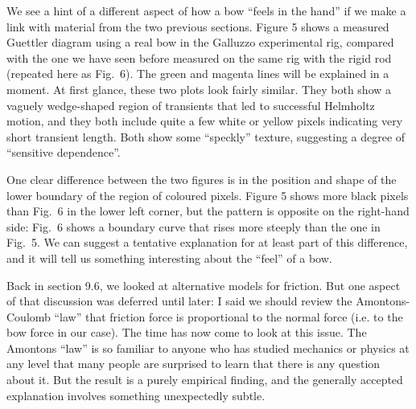 
  We see a hint of a different aspect of how a bow “feels in the hand” if we 
  make a link with material from the two previous sections. Figure 5 shows a 
  measured Guettler diagram using a real bow in the Galluzzo experimental rig, 
  compared with the one we have seen before measured on the same rig with the 
  rigid rod (repeated here as Fig.\ 6). The green and magenta lines will be 
  explained in a moment. At first glance, these two plots look fairly similar. 
  They both show a vaguely wedge-shaped region of transients that led to 
  successful Helmholtz motion, and they both include quite a few white or 
  yellow pixels indicating very short transient length. Both show some 
  “speckly” texture, suggesting a degree of “sensitive dependence”. 



  One clear difference between the two figures is in the position and shape of 
  the lower boundary of the region of coloured pixels. Figure 5 shows more 
  black pixels than Fig.\ 6 in the lower left corner, but the pattern is 
  opposite on the right-hand side: Fig.\ 6 shows a boundary curve that rises 
  more steeply than the one in Fig.\ 5. We can suggest a tentative explanation 
  for at least part of this difference, and it will tell us something 
  interesting about the “feel” of a bow. 

  Back in section 9.6, we looked at alternative models for friction. But one 
  aspect of that discussion was deferred until later: I said we should review 
  the Amontons-Coulomb “law” that friction force is proportional to the normal 
  force (i.e. to the bow force in our case). The time has now come to look at 
  this issue. The Amontons “law” is so familiar to anyone who has studied 
  mechanics or physics at any level that many people are surprised to learn 
  that there is any question about it. But the result is a purely empirical 
  finding, and the generally accepted explanation involves something 
  unexpectedly subtle. 

